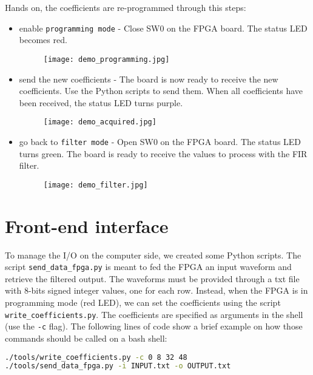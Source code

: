 Hands on, the coefficients are re-programmed through this steps:
\begin{itemize}
    \item enable \texttt{programming mode} - Close SW0 on the FPGA board. The status LED becomes red.
    \begin{figure}[H]
    \centering
    \texttt{[image: demo\_programming.jpg]}
    \end{figure}

    \item send the new coefficients - The board is now ready to receive the new coefficients. Use the Python scripts to send them. When all coefficients have been received, the status LED turns purple.
    \begin{figure}[H]
    \centering
    \texttt{[image: demo\_acquired.jpg]}
    \end{figure}
    
    \item go back to \texttt{filter mode} - Open SW0 on the FPGA board. The status LED turns green. The board is ready to receive the values to process with the FIR filter.
    \begin{figure}[H]
    \centering
    \texttt{[image: demo\_filter.jpg]}
    \end{figure}
\end{itemize}



\section{Front-end interface}
\label{sec:frontend}

To manage the I/O on the computer side, we created some Python scripts. The script \texttt{send\_data\_fpga.py} is meant to fed the FPGA an input waveform and retrieve the filtered output. The waveforms must be provided through a txt file with 8-bits signed integer values, one for each row. Instead, when the FPGA is in programming mode (red LED), we can set the coefficients using the script \texttt{write\_coefficients.py}. The coefficients are specified as arguments in the shell (use the \texttt{-c} flag). The following lines of code show a brief example on how those commands should be called on a bash shell:
\begin{lstlisting}[language=bash]
./tools/write_coefficients.py -c 0 8 32 48
./tools/send_data_fpga.py -i INPUT.txt -o OUTPUT.txt
\end{lstlisting}

